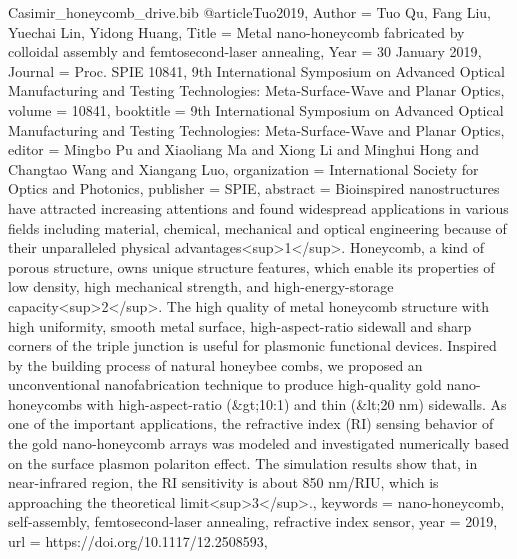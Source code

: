 \documentclass[twoside, 10pt, ptm]{article}
\def\myfilename{Casimir_honeycomb_drive}
\begin{document}
\begin{multicols}{2}
\begin{filecontents}{\myfilename.bib}
@article{Tuo2019,
    Author = {Tuo Qu, Fang Liu, Yuechai Lin, Yidong Huang},
    Title = {Metal nano-honeycomb fabricated by colloidal assembly and femtosecond-laser annealing},
    Year = {30 January 2019},
    Journal = {Proc. SPIE 10841, 9th International Symposium on Advanced Optical Manufacturing and Testing Technologies: Meta-Surface-Wave and Planar Optics},
    volume = {10841},
    booktitle = {9th International Symposium on Advanced Optical Manufacturing and Testing Technologies: Meta-Surface-Wave and Planar Optics},
    editor = {Mingbo Pu and Xiaoliang Ma and Xiong Li and Minghui Hong and Changtao Wang and Xiangang Luo},
    organization = {International Society for Optics and Photonics},
    publisher = {SPIE},
    abstract = {Bioinspired nanostructures have attracted increasing attentions and found widespread applications in various fields including material, chemical, mechanical and optical engineering because of their unparalleled physical advantages<sup>1</sup>. Honeycomb, a kind of porous structure, owns unique structure features, which enable its properties of low density, high mechanical strength, and high-energy-storage capacity<sup>2</sup>. The high quality of metal honeycomb structure with high uniformity, smooth metal surface, high-aspect-ratio sidewall and sharp corners of the triple junction is useful for plasmonic functional devices. Inspired by the building process of natural honeybee combs, we proposed an unconventional nanofabrication technique to produce high-quality gold nano-honeycombs with high-aspect-ratio (&gt;10:1) and thin (&lt;20 nm) sidewalls. As one of the important applications, the refractive index (RI) sensing behavior of the gold nano-honeycomb arrays was modeled and investigated numerically based on the surface plasmon polariton effect. The simulation results show that, in near-infrared region, the RI sensitivity is about 850 nm/RIU, which is approaching the theoretical limit<sup>3</sup>.},
    keywords = {nano-honeycomb, self-assembly, femtosecond-laser annealing, refractive index sensor},
    year = {2019},
    url = {https://doi.org/10.1117/12.2508593},
}



\end{filecontents}
\end{multicols}
\end{document}
